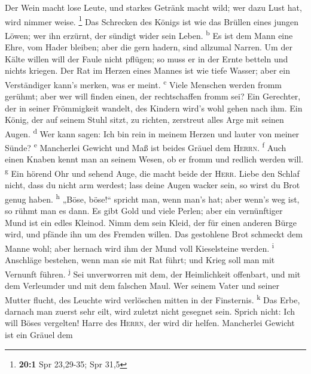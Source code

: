  Der Wein macht lose Leute, und starkes Getränk macht
wild; wer dazu Lust hat, wird nimmer weise. \footnote{\textbf{20:1} Spr
  23,29-35; Spr 31,5}  Das Schrecken des Königs ist wie
das Brüllen eines jungen Löwen; wer ihn erzürnt, der sündigt wider sein
Leben. \textsuperscript{b}  Es ist dem Mann eine Ehre, vom
Hader bleiben; aber die gern hadern, sind allzumal Narren.
 Um der Kälte willen will der Faule nicht pflügen; so muss
er in der Ernte betteln und nichts kriegen.  Der Rat im
Herzen eines Mannes ist wie tiefe Wasser; aber ein Verständiger kann's
merken, was er meint. \textsuperscript{c}  Viele Menschen
werden fromm gerühmt; aber wer will finden einen, der rechtschaffen
fromm sei?  Ein Gerechter, der in seiner Frömmigkeit
wandelt, des Kindern wird's wohl gehen nach ihm.  Ein
König, der auf seinem Stuhl sitzt, zu richten, zerstreut alles Arge mit
seinen Augen. \textsuperscript{d}  Wer kann sagen: Ich bin
rein in meinem Herzen und lauter von meiner Sünde? \textsuperscript{e}
 Mancherlei Gewicht und Maß ist beides Gräuel dem
\textsc{Herrn}. \textsuperscript{f}  Auch einen Knaben
kennt man an seinem Wesen, ob er fromm und redlich werden will.
\textsuperscript{g}  Ein hörend Ohr und sehend Auge, die
macht beide der \textsc{Herr}.  Liebe den Schlaf nicht,
dass du nicht arm werdest; lass deine Augen wacker sein, so wirst du
Brot genug haben. \textsuperscript{h}  „Böse, böse!{}``
spricht man, wenn man's hat; aber wenn's weg ist, so rühmt man es dann.
 Es gibt Gold und viele Perlen; aber ein vernünftiger
Mund ist ein edles Kleinod.  Nimm dem sein Kleid, der für
einen anderen Bürge wird, und pfände ihn um des Fremden willen.
 Das gestohlene Brot schmeckt dem Manne wohl; aber
hernach wird ihm der Mund voll Kieselsteine werden. \textsuperscript{i}
 Anschläge bestehen, wenn man sie mit Rat führt; und
Krieg soll man mit Vernunft führen. \textsuperscript{j} 
Sei unverworren mit dem, der Heimlichkeit offenbart, und mit dem
Verleumder und mit dem falschen Maul.  Wer seinem Vater
und seiner Mutter flucht, des Leuchte wird verlöschen mitten in der
Finsternis. \textsuperscript{k}  Das Erbe, darnach man
zuerst sehr eilt, wird zuletzt nicht gesegnet sein. 
Sprich nicht: Ich will Böses vergelten! Harre des \textsc{Herrn}, der
wird dir helfen.  Mancherlei Gewicht ist ein Gräuel dem
